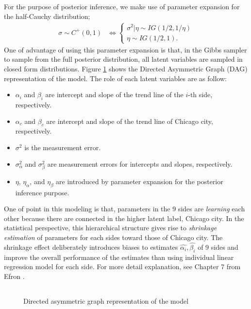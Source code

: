 \documentclass[11pt,a4paper]{article}
\begin{document}
For the purpose of posterior inference, we make use of parameter expansion for the half-Cauchy distribution; 
\begin{align}
\sigma \sim C^{+}(0,1) & \Leftrightarrow
\begin{cases}
\sigma^{2} | \eta \sim IG(1/2, 1/\eta)\\
\eta \sim IG(1/2, 1).
\end{cases}
\end{align}
One of advantage of using this parameter expansion is that, in the Gibbs sampler to sample from the full posterior distribution, all latent variables are sampled in closed form distributions. Figure \ref{fig:DAG_model} shows the Directed Asymmetric Graph (DAG) representation of the model.   The role of each latent variables are as follow:
\begin{itemize}
\item $\alpha_{i}$ and $\beta_{i} $ are intercept and slope of the trend line of the $i$-th side, respectively. 
\item $\alpha_{c}$ and $\beta_{c} $ are intercept and slope of the trend line of Chicago city, respectively. 
\item $\sigma^{2}$ is the measurement error. 
\item $\sigma_{\alpha}^{2}$ and $\sigma_{\beta}^{2}$ are measurement errors for intercepts and slopes, respectively. \\
\item $\eta$, $\eta_{\alpha}$, and $\eta_{\beta}$ are introduced by parameter expansion for the posterior inference purpose. 
\end{itemize}
One of point in this modeling is that, parameters in the 9 sides are \emph{learning} each other because there are connected in the higher latent label, Chicago city. In the statistical perspective, this hierarchical structure gives rise to \emph{shrinkage estimation} of parameters for each sides toward those of Chicago city. The shrinkage effect deliberately introduces biases to estimates $\hat{\alpha_{i}} ,\hat{\beta_{i}} $ of 9 sides and improve the overall performance of the estimates than using individual linear regression model for each side. For more detail explanation, see Chapter 7 from Efron \cite{efron2016}. 
\begin{figure}[h]
  \begin{center}
    \begin{tabular}{cc}
       
    \end{tabular}
  \end{center}
  \caption{Directed asymmetric graph representation of the model}
  \label{fig:DAG_model}
\end{figure}
\newpage
\end{document}
